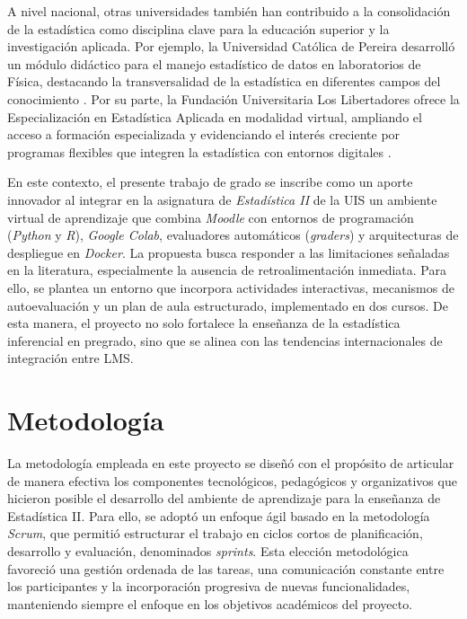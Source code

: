 \documentclass[letter,oneside,12pt,spanish]{report}
\begin{document}
A nivel nacional, otras universidades también han contribuido a la consolidación de la estadística
 como disciplina clave para la educación superior y la investigación aplicada. Por ejemplo, la 
 Universidad Católica de Pereira desarrolló un módulo didáctico para el manejo estadístico de 
 datos en laboratorios de Física, destacando la transversalidad de la estadística en diferentes 
 campos del conocimiento \parencite{ucp2018}. Por su parte, la Fundación Universitaria Los 
 Libertadores ofrece la Especialización en Estadística Aplicada en modalidad virtual, ampliando 
 el acceso a formación especializada y evidenciando el interés creciente por programas flexibles 
 que integren la estadística con entornos digitales \parencite{libertadoressf}.

En este contexto, el presente trabajo de grado se inscribe como un aporte innovador al 
integrar en la asignatura de \textit{Estadística II} de la UIS un ambiente virtual de aprendizaje 
que combina \textit{Moodle} con entornos de programación (\textit{Python} y \textit{R}), 
\textit{Google Colab}, evaluadores automáticos (\textit{graders}) y arquitecturas de despliegue en 
\textit{Docker}. La propuesta busca responder a las limitaciones señaladas en la literatura, 
especialmente la ausencia de retroalimentación inmediata. Para ello, se plantea un entorno que 
incorpora actividades interactivas, mecanismos de autoevaluación y un plan de aula estructurado, 
implementado en dos cursos. De esta manera, el proyecto no solo fortalece la enseñanza de la 
estadística inferencial en pregrado, sino que se alinea con las tendencias internacionales de 
integración entre LMS.

\newpage

\chapter{Metodología}

La metodología empleada en este proyecto se diseñó con el propósito de articular de manera efectiva los componentes tecnológicos, pedagógicos y organizativos que hicieron posible el desarrollo del ambiente de aprendizaje para la enseñanza de Estadística II. Para ello, se adoptó un enfoque ágil basado en la metodología \textit{Scrum}, que permitió estructurar el trabajo en ciclos cortos de planificación, desarrollo y evaluación, denominados \textit{sprints}. Esta elección metodológica favoreció una gestión ordenada de las tareas, una comunicación constante entre los participantes y la incorporación progresiva de nuevas funcionalidades, manteniendo siempre el enfoque en los objetivos académicos del proyecto.
\end{document}
